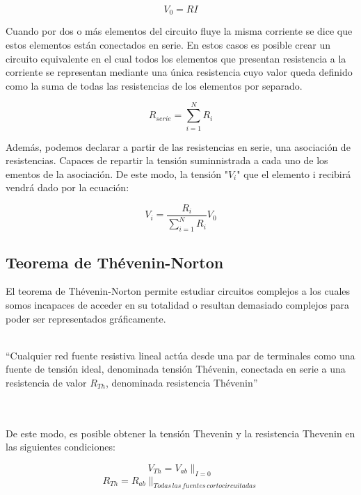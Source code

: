\documentclass[a4paper,11pt]{article}
\begin{document}
\begin{displaymath}
V_{0}=RI
\end{displaymath}

Cuando por dos o más elementos del circuito fluye la misma corriente se dice que estos elementos están conectados en serie. En estos casos es posible crear un circuito equivalente en el cual todos los elementos que presentan resistencia a la corriente se representan mediante una única resistencia cuyo valor queda definido como la suma de todas las resistencias de los elementos por separado.

\begin{displaymath}
R_{serie}=\sum_{i=1}^N R_{i}
\end{displaymath}

Además, podemos declarar a partir de las resistencias en serie, una asociación de resistencias. Capaces de repartir la tensión suminnistrada a cada uno de los ementos de la asociación. De este modo, la tensión "$V_i$" que el elemento i recibirá vendrá dado por la ecuación:

\begin{displaymath}
V_i=\frac{R_i}{\sum_{i=1}^N R_{i}}V_0
\end{displaymath}

\subsection{Teorema de Thévenin-Norton}
El teorema de Thévenin-Norton permite estudiar circuitos complejos a los cuales somos incapaces de acceder en su totalidad o resultan demasiado complejos para poder ser representados gráficamente.\\ \\

\begin{em}
“Cualquier red fuente resistiva lineal actúa desde una par de terminales como una fuente de tensión ideal, denominada tensión Thévenin, conectada en serie a una resistencia de valor $R_{Th}$, denominada resistencia Thévenin”
\end{em}\\ \\
De este modo, es posible obtener la tensión Thevenin y la resistencia Thevenin en las siguientes condiciones:

\begin{displaymath}
V_{Th}=V_{ab}\|_{I=0}
\end{displaymath}
\begin{displaymath}
R_{Th}=R_{ab}\|_{Todas\,las\,fuentes\,cortocircuitadas}
\end{displaymath}
\end{document}
